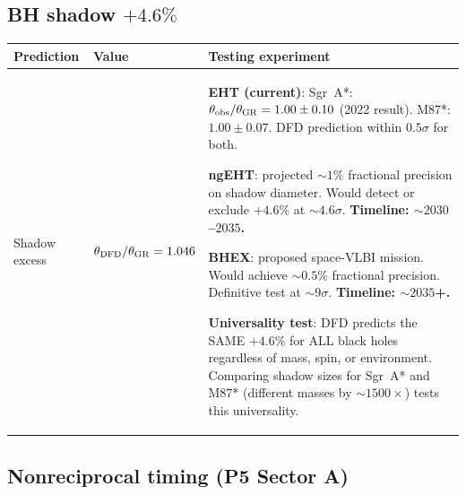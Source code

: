 \documentclass[11pt]{article}
\begin{document}
\subsection{BH shadow $+4.6\%$}

\begin{table}[H]
\centering
\begin{tabular}{p{3cm}p{3cm}p{6cm}}
\toprule
\textbf{Prediction} & \textbf{Value} & \textbf{Testing experiment} \\
\midrule
Shadow excess & $\theta_{\rm DFD}/\theta_{\rm GR} = 1.046$ &
  \textbf{EHT (current)}: Sgr~A*: $\theta_{\rm obs}/\theta_{\rm GR} =
  1.00 \pm 0.10$ (2022 result). M87*: $1.00 \pm 0.07$. DFD prediction
  within $0.5\sigma$ for both.

  \textbf{ngEHT}: projected $\sim 1\%$ fractional precision on shadow
  diameter. Would detect or exclude $+4.6\%$ at $\sim 4.6\sigma$.
  \textbf{Timeline: $\sim 2030$--$2035$.}

  \textbf{BHEX}: proposed space-VLBI mission. Would achieve $\sim 0.5\%$
  fractional precision. Definitive test at $\sim 9\sigma$.
  \textbf{Timeline: $\sim 2035$+.}

  \textbf{Universality test}: DFD predicts the SAME $+4.6\%$ for ALL
  black holes regardless of mass, spin, or environment. Comparing shadow
  sizes for Sgr~A* and M87* (different masses by $\sim 1500\times$)
  tests this universality. \\
\bottomrule
\end{tabular}
\end{table}

\subsection{Nonreciprocal timing (P5 Sector A)}
\end{document}

